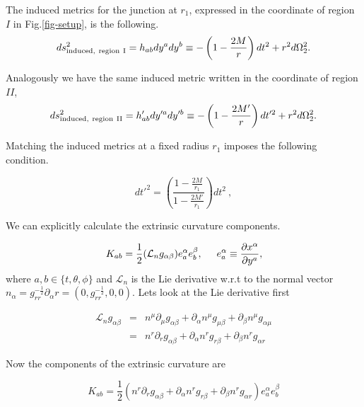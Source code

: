 \documentclass[aps,showpacs,onecolumn,floats,prd,superscriptaddress,nofootinbib]{revtex4-1}
\begin{document}
The induced metrics for the junction at $r_1$, expressed in the coordinate of region $I$ in Fig.\ref{fig-setup}, is the following.
\begin{equation}
	ds_{\rm induced, \ region \ I}^2 = h_{ab} dy^a dy^b \equiv - \left( 1 - \frac{2M}{r} \right) dt^2 + r^2 d \Omega_2^2.	\label{13}
\end{equation}

Analogously we have the same induced metric written in the coordinate of region $II$,
\begin{equation}
	ds_{\rm induced, \ region \ II}^2 = h'_{ab} dy'^a dy'^b \equiv - \left( 1 - \frac{2M'}{r} \right) dt'^2 + r^2 d \Omega_2^2.	\label{14}
\end{equation}

Matching the induced metrics at a fixed radius $r_1$ imposes the following condition. 

\begin{equation}
	dt'^2 = \left( \frac{1 - \frac{2M}{r_1}}{ 1- \frac{2M'}{r_1}} \right) dt^2~,
\end{equation}

We can explicitly calculate the extrinsic curvature components.

\begin{equation}
	K_{ab} = \frac{1}{2} (\mathcal{L}_n g_{\alpha \beta}) e^\alpha_a e^\beta_b, \hspace{5mm} e^\alpha_a \equiv \frac{\partial x^\alpha}{\partial y^a},
\end{equation}
where $a,b \in \{t,\theta, \phi \}$ and $\mathcal{L}_n$ is the Lie derivative w.r.t to the normal vector $n_\alpha = g_{rr}^{-\frac{1}{2}} \partial_\alpha r = (0, g_{rr}^{-\frac{1}{2}}, 0 , 0)$. Lets look at the Lie derivative first

\begin{eqnarray}
	\mathcal{L}_n g_{\alpha \beta} & = & n^\mu \partial_\mu g_{\alpha \beta} + \partial_\alpha n^\mu g_{\mu \beta} + \partial_\beta n^\mu g_{\alpha \mu}	\nonumber	\\
	& = & n^r \partial_r g_{\alpha \beta} + \partial_\alpha n^r g_{r \beta} + \partial_\beta n^r g_{\alpha r}	
\end{eqnarray}

Now the components of the extrinsic curvature are

\begin{equation}
	K_{ab} = \frac{1}{2} (n^r \partial_r g_{\alpha \beta} + \partial_\alpha n^r g_{r \beta} + \partial_\beta n^r g_{\alpha r}) e^\alpha_a e^\beta_b	\label{Ecuv}
\end{equation}
\end{document}
